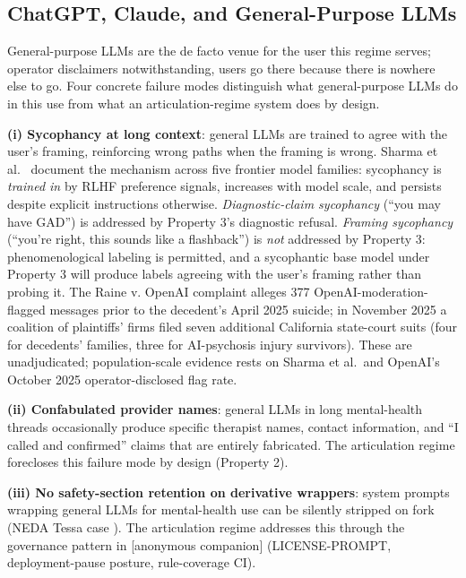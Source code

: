 \documentclass[letterpaper]{article}
\begin{document}
\subsection{ChatGPT, Claude, and General-Purpose LLMs}

General-purpose LLMs are the de facto venue for the user this regime serves; operator disclaimers notwithstanding, users go there because there is nowhere else to go. Four concrete failure modes distinguish what general-purpose LLMs do in this use from what an articulation-regime system does by design.

\textbf{(i) Sycophancy at long context}: general LLMs are trained to agree with the user's framing, reinforcing wrong paths when the framing is wrong. Sharma et al.~\citep{sharma2023sycophancy} document the mechanism across five frontier model families: sycophancy is \emph{trained in} by RLHF preference signals, increases with model scale, and persists despite explicit instructions otherwise. \emph{Diagnostic-claim sycophancy} (``you may have GAD'') is addressed by Property 3's diagnostic refusal. \emph{Framing sycophancy} (``you're right, this sounds like a flashback'') is \emph{not} addressed by Property 3: phenomenological labeling is permitted, and a sycophantic base model under Property 3 will produce labels agreeing with the user's framing rather than probing it. The Raine v. OpenAI complaint \citep{raine2025openai} alleges 377 OpenAI-moderation-flagged messages prior to the decedent's April 2025 suicide; in November 2025 a coalition of plaintiffs' firms filed seven additional California state-court suits (four for decedents' families, three for AI-psychosis injury survivors). These are unadjudicated; population-scale evidence rests on Sharma et al.~and OpenAI's October 2025 operator-disclosed flag rate.

\textbf{(ii) Confabulated provider names}: general LLMs in long mental-health threads occasionally produce specific therapist names, contact information, and ``I called and confirmed'' claims that are entirely fabricated. The articulation regime forecloses this failure mode by design (Property 2).

\textbf{(iii) No safety-section retention on derivative wrappers}: system prompts wrapping general LLMs for mental-health use can be silently stripped on fork (NEDA Tessa case \citep{aiid2023neda}). The articulation regime addresses this through the governance pattern in {[}anonymous companion{]} (LICENSE-PROMPT, deployment-pause posture, rule-coverage CI).
\end{document}
